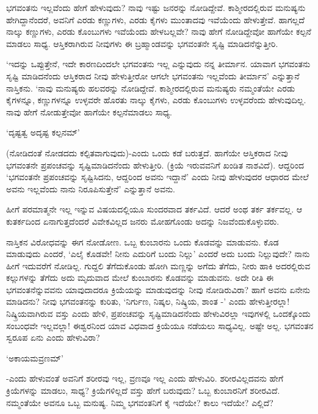 ಭಗವಂತನು ಇಲ್ಲವೆಂದು ಹೇಗೆ ಹೇಳುವುದು? ನಾವು ಇಷ್ಟು ಜನರನ್ನು ನೋಡಿದ್ದೇವೆ. ಕಾಶ್ಮೀರದಲ್ಲಿರುವ ಮನುಷ್ಯನು ಹೇಗಿದ್ದಾನೆಂದರೆ, ಅವನಿಗೆ ಎರಡು ಕಣ್ಣುಗಳು, ಎರಡು ಕೈಗಳು ಮುಂತಾದವು ಇವೆಯೆಂದು ಹೇಳುತ್ತೇವೆ. ಹಾಗಲ್ಲದೆ ನಾಲ್ಕು ಕಣ್ಣುಗಳು, ಎರಡು ಕೊಂಬುಗಳು ಇವೆಯೆಂದು ಹೇಳಬಲ್ಲವೇ? ನಾವು ಹೇಗೆ ನೋಡಿದ್ದೇವೋ ಹಾಗೆಯೇ ಕಲ್ಪನೆ ಮಾಡಲು ಸಾಧ್ಯ. ಆಸ್ತಿಕರಾಗಿರುವ ನೀವುಗಳು ಈ ಬ್ರಹ್ಮಾಂಡವನ್ನು ಭಗವಂತನೇ ಸೃಷ್ಟಿ ಮಾಡಿದನೆನ್ನುತ್ತೀರಿ.

`ಇದನ್ನು ಒಪ್ಪುತ್ತೇನೆ, ಇದೇ ಕಾರಣದಿಂದಲೇ ಭಗವಂತನು ಇಲ್ಲ ಎನ್ನುವುದು ನನ್ನ ತೀರ್ಮಾನ. ಯಾವಾಗ ಭಗವಂತನು ಸೃಷ್ಟಿ ಮಾಡಿದನೆಂದು ಆಸ್ತಿಕರಾದ ನೀವು ಹೇಳುತ್ತೀರೋ ಆಗಲೇ ಭಗವಂತನು ಇಲ್ಲವೆಂದು ತೀರ್ಮಾನ' ಎನ್ನುತ್ತಾನೆ ನಾಸ್ತಿಕನು. `ನಾವು ಮನುಷ್ಯರು ಹಲವರನ್ನು ನೋಡಿದ್ದೇವೆ. ಕಾಶ್ಮೀರದಲ್ಲಿರುವ ಮನುಷ್ಯರು ನಮ್ಮಂತೆಯೇ ಎರಡು ಕೈಗಳನ್ನೂ, ಕಣ್ಣುಗಳನ್ನೂ ಉಳ್ಳವರೇ ಹೊರತು ನಾಲ್ಕು ಕೈಗಳು, ಎರಡು ಕೊಂಬುಗಳು ಉಳ್ಳವರೆಂದು ಹೇಳುವುದಿಲ್ಲ. ನಾವು ಹೇಗೆ ನೋಡುತ್ತೇವೋ ಹಾಗೆಯೇ ಕಲ್ಪನೆಮಾಡಲು ಸಾಧ್ಯ.

\begin{shloka}
`ದೃಷ್ಟತ್ವ ಅದೃಷ್ಟ ಕಲ್ಪನಮ್'
\end{shloka}

(ನೋಡಿದಂತೆ ನೋಡದದು ಕಲ್ಪಿತವಾಗುವುದು)-ಎಂದು ಒಂದು ಕಡೆ ಬರುತ್ತದೆ. ಹಾಗೆಯೇ ಆಸ್ತಿಕರಾದ ನೀವು ಭಗವಂತನೇ ಪ್ರಪಂಚವನ್ನು ಸೃಷ್ಟಿಮಾಡಿದನೆಂದು ಹೇಳುತ್ತೀರಿ. (ಕ್ರಿಯೆ ಇರುವವನಿಗೆ ಖಂಡಿತ ನಾಶವಿದೆ). ಆದ್ದರಿಂದ `ಭಗವಂತನೇ ಪ್ರಪಂಚವನ್ನು ಸೃಷ್ಟಿಸಿದನು, ಆದ್ದರಿಂದ ಅವನು ಇದ್ದಾನೆ' ಎಂದು ನೀವು ಹೇಳುವುದರ ಆಧಾರದ ಮೇಲೆ ಅವನು ಇಲ್ಲವೆಂದು ನಾನು ನಿರೂಪಿಸುತ್ತೇನೆ' ಎನ್ನುತ್ತಾನೆ ಅವನು.

ಹೀಗೆ ಪರಮಾತ್ಮನೇ ಇಲ್ಲ ಇನ್ನುವ ವಿಷಯದಲ್ಲಿಯೂ ಸುಂದರವಾದ ತರ್ಕವಿದೆ. ಆದರೆ ಅಂಥ ತರ್ಕ ತರ್ಕವಲ್ಲ. ಆ ಕುತರ್ಕದಿಂದ ಏನಾಗುತ್ತದೆಂದರೆ ವಿವೇಕವಿಲ್ಲದ ಜನರು ಮೋಹಗೊಂಡು ಅದನ್ನು ನಿಜವೆಂದುಕೊಳ್ಳುವರು.

ನಾಸ್ತಿಕನ ವಿರೋಧವನ್ನು ಈಗ ನೋಡೋಣ. ಒಬ್ಬ ಕುಂಬಾರನು ಒಂದು ಕೊಡವನ್ನು ಮಾಡುವನು. ಕೊಡ ಮಾಡುವುದು ಎಂದರೆ, `ಎಲೈ ಕೊಡವೇ! ನೀನು ಎದುರಿಗೆ ಬಂದು ನಿಲ್ಲು' ಎಂದರೆ ಅದು ಬಂದು ನಿಲ್ಲುವುದೇ? ನಾನು ಹೀಗೆ ಇದುವರೆಗೆ ನೋಡಿಲ್ಲ. ಗುದ್ದಲಿ ತೆಗೆದುಕೊಂಡು ಹೋಗಿ ಮಣ್ಣನ್ನು ಅಗೆದು ತೆಗೆದು, ನೀರು ಹಾಕಿ ಅದರಲ್ಲಿರುವ ಕಲ್ಲುಗಳನ್ನು ತೆಗೆದು ಅದು ಮೃದುವಾದ ಮೇಲೆ ಕುಂಬಾರನು ಕೊಡವನ್ನು ಮಾಡುವನು. ಅದೇ ರೀತಿ ಈ ಭಗವಂತನೆನ್ನುವವನು ಯಾವುದಾದರೂ ಕ್ರಿಯೆಯನ್ನು ಮಾಡುವುದನ್ನು ನೀವು ನೋಡಿರುವಿರಾ? ಹಾಗೆ ಅವನು ಏನೇನು ಮಾಡಿದನು? ನೀವು ಭಗವಂತನನ್ನು ಕುರಿತು, `ನಿರ್ಗುಣ, ನಿಷ್ಕಲ, ನಿಷ್ಕ್ರಿಯ, ಶಾಂತ -' ಎಂದು ಹೇಳುತ್ತೀರಲ್ಲಾ! ನಿಷ್ಕ್ರಿಯವಾಗಿರುವ ವಸ್ತು ಎಂದು ಹೇಳಿ, ಪ್ರಪಂಚವನ್ನು ಸೃಷ್ಟಿಮಾಡಿದನೆಂದು ಹೇಳುವಿರಲ್ಲಾ ಇವುಗಳಲ್ಲಿ ಒಂದಕ್ಕೊಂದು ಸಂಬಂಧವೇ ಇಲ್ಲವಲ್ಲಾ! ಈಶ್ವರನಿಂದ ಯಾವ ವಿಧವಾದ ಕ್ರಿಯೆಯೂ ನಡೆಯಲು ಸಾಧ್ಯವಿಲ್ಲ. ಅಷ್ಟೇ ಅಲ್ಲ. ಭಗವಂತನ ಸ್ವರೂಪ ಏನು ಎಂದು ಹೇಳುವಿರಾ?


\begin{shloka}
`ಅಕಾಯಮವ್ರಣಮ್'
\end{shloka}

-ಎಂದು ಹೇಳುವಂತೆ ಅವನಿಗೆ ಶರೀರವು ಇಲ್ಲ, ವ್ರಣವೂ ಇಲ್ಲ ಎಂದು ಹೇಳುವಿರಿ. ಶರೀರವಿಲ್ಲದವನು ಹೇಗೆ ಕ್ರಿಯೆಗಳನ್ನು ಮಾಡಲು, ಸಾಧ್ಯ? ಕ್ರಿಯೆಗಳಿಲ್ಲದೆ ವಸ್ತು ಹೇಗೆ ಬರುವುದು? ಒಬ್ಬ ಕುಂಬಾರನಿಗೆ ಶರೀರವಿದೆ. ನಮ್ಮಂತೆಯೇ ಅವನೂ ಒಬ್ಬ ಮನುಷ್ಯ. ನಿಮ್ಮ ಭಗವಂತನಿಗೆ ಕೈ ಇದೆಯೇ? ಕಾಲು ಇದೆಯೇ? ಎಲ್ಲಿದೆ?

